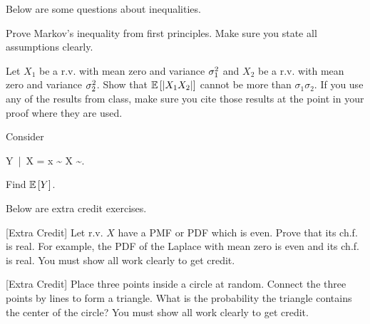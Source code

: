 \documentclass[12pt]{article}
\begin{document}
\problem Below are some questions about inequalities.


\benum
{} Prove Markov's inequality from first principles. Make sure you state all assumptions clearly.

 Let $X_1$ be a r.v. with mean zero and variance $\sigma^2_1$ and $X_2$ be a r.v. with mean zero and variance $\sigma^2_2$. Show that $\mathbb{E}\left[|X_1 X_2|\right]$ cannot be more than $\sigma_1 \sigma_2$. If you use any of the results from class, make sure you cite those results at the point in your proof where they are used.
\eenum

\problem Consider

\beqn
Y~|~X = x \sim {} \quad {} \quad X \sim {}.
\eeqn

\benum



 Find $\mathbb{E}\left[Y\right]$. 

\eenum

\problem Below are extra credit exercises. 


\benum

 [Extra Credit] Let r.v. $X$ have a PMF or PDF which is even. Prove that its ch.f. is real. For example, the PDF of the Laplace with mean zero is even and its ch.f. is real. You must show all work clearly to get credit.


 [Extra Credit] Place three points inside a circle at random. Connect the three points by lines to form a triangle. What is the probability the triangle contains the center of the circle? You must show all work clearly to get credit. 

\eenum
\end{document}
